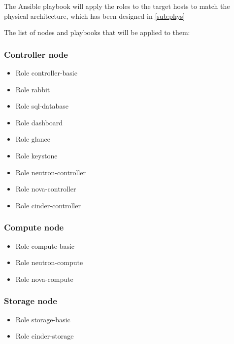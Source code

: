 The Ansible playbook will apply the roles to the target hosts to match the physical architecture, which has been designed in \ref{sub:phys}

The list of nodes and playbooks that will be applied to them:

\subsubsection{Controller node}

\begin{itemize}
  \item{Role controller-basic}
  \item{Role rabbit}
  \item{Role sql-database}
  \item{Role dashboard}
  \item{Role glance}
  \item{Role keystone}
  \item{Role neutron-controller}
  \item{Role nova-controller}
  \item{Role cinder-controller}
\end{itemize}

\subsubsection{Compute node}

\begin{itemize}
  \item{Role compute-basic}
  \item{Role neutron-compute}
  \item{Role nova-compute}
\end{itemize}

\subsubsection{Storage node}

\begin{itemize}
  \item{Role storage-basic}
  \item{Role cinder-storage}
\end{itemize}
